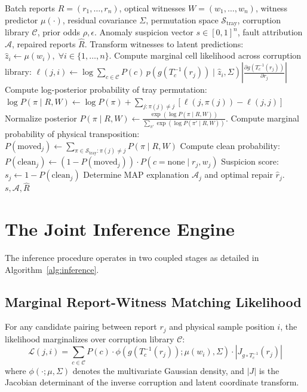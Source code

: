 \documentclass[journal,twoside]{IEEEtran}
\begin{document}
\begin{algorithm}[!t]
\caption{Joint Batch Permutation and Corruption Inference (EdaphNet-JBC)}
\label{alg:inference}
\begin{algorithmic}[1]
\REQUIRE Batch reports $R = (r_1, \dots, r_n)$, optical witnesses $W = (w_1, \dots, w_n)$, witness predictor $\mu(\cdot)$, residual covariance $\Sigma$, permutation space $\mathcal{S}_{\text{tray}}$, corruption library $\mathcal{C}$, prior odds $\rho, \epsilon$.
\ENSURE Anomaly suspicion vector $s \in [0, 1]^n$, fault attribution $\mathcal{A}$, repaired reports $\hat{R}$.
\STATE Transform witnesses to latent predictions: $\hat{z}_i \leftarrow \mu(w_i), \; \forall i \in \{1, \dots, n\}$.
        \STATE Compute marginal cell likelihood across corruption library:
        \STATE $\ell(j, i) \leftarrow \log \sum_{c \in \mathcal{C}} P(c) \, p\left(g(T_c^{-1}(r_j)) \mid \hat{z}_i, \Sigma\right) \left| \frac{\partial g(T_c^{-1}(r_j))}{\partial r_j} \right|$
    \ENDFOR
\ENDFOR
{}
    \STATE Compute log-posterior probability of tray permutation:
    \STATE $\log P(\pi \mid R, W) \leftarrow \log P(\pi) + \sum_{j: \pi(j) \neq j} \left[ \ell(j, \pi(j)) - \ell(j, j) \right]$
\ENDFOR
\STATE Normalize posterior $P(\pi \mid R, W) \leftarrow \frac{\exp(\log P(\pi \mid R, W))}{\sum_{\pi'} \exp(\log P(\pi' \mid R, W))}$.
    \STATE Compute marginal probability of physical transposition:
    \STATE $P(\text{moved}_j) \leftarrow \sum_{\pi \in \mathcal{S}_{\text{tray}}: \pi(j) \neq j} P(\pi \mid R, W)$
    \STATE Compute clean probability: $P(\text{clean}_j) \leftarrow (1 - P(\text{moved}_j)) \cdot P(c = \text{none} \mid r_j, w_j)$
    \STATE Suspicion score: $s_j \leftarrow 1 - P(\text{clean}_j)$
    \STATE Determine MAP explanation $\mathcal{A}_j$ and optimal repair $\hat{r}_j$.
\ENDFOR
\RETURN $s, \mathcal{A}, \hat{R}$
\end{algorithmic}
\end{algorithm}

\section{The Joint Inference Engine}
The inference procedure operates in two coupled stages as detailed in Algorithm~\ref{alg:inference}.

\subsection{Marginal Report-Witness Matching Likelihood}
For any candidate pairing between report $r_j$ and physical sample position $i$, the likelihood marginalizes over corruption library $\mathcal{C}$:
\begin{equation}
\mathcal{L}(j, i) = \sum_{c \in \mathcal{C}} P(c) \cdot \phi\left(g(T_c^{-1}(r_j)); \mu(w_i), \Sigma\right) \cdot \left| J_{g \circ T_c^{-1}}(r_j) \right|
\label{eq:marginal_likelihood}
\end{equation}
where $\phi(\cdot; \mu, \Sigma)$ denotes the multivariate Gaussian density, and $|J|$ is the Jacobian determinant of the inverse corruption and latent coordinate transform. 
\end{document}
